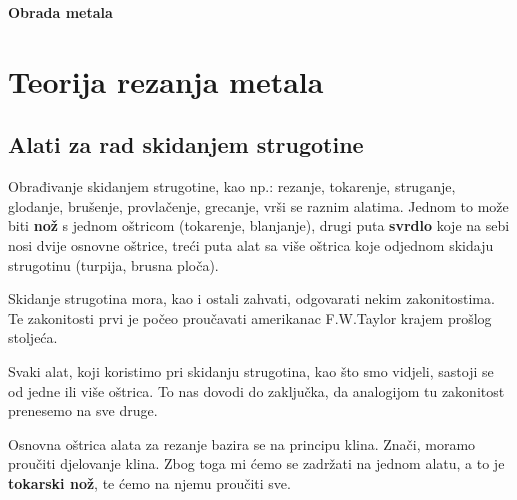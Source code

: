 \documentclass[a4paper,12pt]{article}
\numberwithin{figure}{section}
\begin{document}
\begin{titlepage}
  \null\vfill

  \begin{center}

  {\huge\bfseries Obrada metala}
  \vskip 2cm
  
  \end{center}
\vfill
\hfill
\end{titlepage}
\clearpage
\tableofcontents
\clearpage
\section{Teorija rezanja metala}
\subsection{Alati za rad skidanjem strugotine}
Obrađivanje skidanjem strugotine, kao np.: rezanje, tokarenje, struganje, glodanje, brušenje, provlačenje, grecanje, vrši se raznim alatima. Jednom to može biti \textbf{nož} s jednom oštricom (tokarenje, blanjanje), drugi puta \textbf{svrdlo} koje na sebi nosi dvije osnovne oštrice, treći puta alat sa više oštrica koje odjednom skidaju strugotinu (turpija, brusna ploča). \par 
Skidanje strugotina mora, kao i ostali zahvati, odgovarati nekim zakonitostima. Te zakonitosti prvi je počeo proučavati amerikanac F.W.Taylor krajem prošlog stoljeća.\par
Svaki alat, koji koristimo pri skidanju strugotina, kao što smo vidjeli, sastoji se od jedne ili više oštrica. To nas dovodi do zaključka, da analogijom tu zakonitost prenesemo na sve druge.\par
Osnovna oštrica alata za rezanje bazira se na principu klina. Znači, moramo proučiti djelovanje klina. Zbog toga mi ćemo se zadržati na jednom alatu, a to je \textbf{tokarski nož}, te ćemo na njemu proučiti sve.
\end{document}
